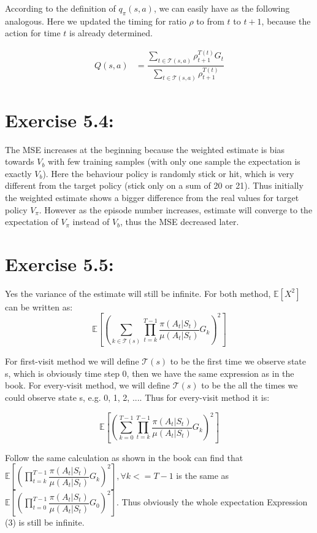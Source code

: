 \documentclass[10pt,letterpaper]{article}
\newcommand{\e}{\mathbb E}
\begin{document}
According to the definition of $q_\pi(s,a)$, we can easily have as the following analogous. Here we updated the timing for ratio $\rho$ to from $t$ to $t+1$, because the action for time $t$ is already determined.

\begin{align}
Q(s,a) &= \dfrac{\sum_{t\in \mathcal{T}(s,a)}\rho_{t+1}^{T(t)}G_t}{\sum_{t\in \mathcal{T}(s,a)}\rho_{t+1}^{T(t)}}
\end{align}

\section*{Exercise 5.4: }
\label{5.4}

The MSE increases at the beginning because the weighted estimate is bias towards $V_b$ with few training samples (with only one sample the expectation is exactly $V_b$). Here the behaviour policy is randomly stick or hit, which is very different from the target policy (stick only on a sum of 20 or 21). Thus initially the weighted estimate shows a bigger difference from the real values for target policy $V_\pi$. However as the episode number increases, estimate will converge to the expectation of $V_\pi$ instead of $V_b$, thus the MSE decreased later.

\section*{Exercise 5.5: }
\label{5.5}

Yes the variance of the estimate will still be infinite. For both method, $\e[X^2]$ can be written as: 
\begin{equation}
\e\left[\left(\sum_{k\in\mathcal{T}(s)}\prod_{t=k}^{T-1}\dfrac{\pi(A_t|S_t)}{\mu(A_t|S_t)}G_k\right)^2\right]
\end{equation}

For first-visit method we will define $\mathcal{T}(s)$ to be the first time we observe state s, which is obviously time step 0, then we have the same expression as in the book. For every-visit method, we will define $\mathcal{T}(s)$ to be the all the times we could observe state s, e.g. 0, 1, 2, .... Thus for every-visit method it is:

\begin{equation}
\e\left[\left(\sum_{k=0}^{T-1}\prod_{t=k}^{T-1}\dfrac{\pi(A_t|S_t)}{\mu(A_t|S_t)}G_k\right)^2\right]
\end{equation}

Follow the same calculation as shown in the book can find that $\e\left[\left(\prod_{t=k}^{T-1}\dfrac{\pi(A_t|S_t)}{\mu(A_t|S_t)}G_k\right)^2\right], \forall k <= T-1$ is the same as $\e\left[\left(\prod_{t=0}^{T-1}\dfrac{\pi(A_t|S_t)}{\mu(A_t|S_t)}G_0\right)^2\right]$. Thus obviously the whole expectation Expression (3) is still be infinite.
\end{document}
